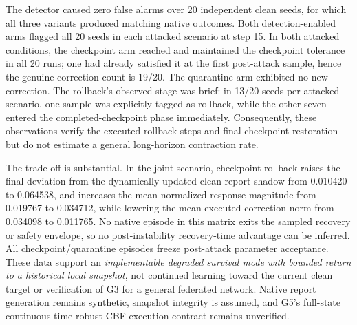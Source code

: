 The detector caused zero false alarms over 20 independent clean seeds, for which all three variants produced matching native outcomes. Both detection-enabled arms flagged all 20 seeds in each attacked scenario at step 15. In both attacked conditions, the checkpoint arm reached and maintained the checkpoint tolerance in all 20 runs; one had already satisfied it at the first post-attack sample, hence the genuine correction count is 19/20. The quarantine arm exhibited no new correction. The rollback's observed stage was brief: in 13/20 seeds per attacked scenario, one sample was explicitly tagged as rollback, while the other seven entered the completed-checkpoint phase immediately. Consequently, these observations verify the executed rollback steps and final checkpoint restoration but do not estimate a general long-horizon contraction rate.

The trade-off is substantial. In the joint scenario, checkpoint rollback raises the final deviation from the dynamically updated clean-report shadow from 0.010420 to 0.064538, and increases the mean normalized response magnitude from 0.019767 to 0.034712, while lowering the mean executed correction norm from 0.034098 to 0.011765. No native episode in this matrix exits the sampled recovery or safety envelope, so no post-instability recovery-time advantage can be inferred. All checkpoint/quarantine episodes freeze post-attack parameter acceptance. These data support an \emph{implementable degraded survival mode with bounded return to a historical local snapshot}, not continued learning toward the current clean target or verification of G3 for a general federated network. Native report generation remains synthetic, snapshot integrity is assumed, and G5's full-state continuous-time robust CBF execution contract remains unverified.
